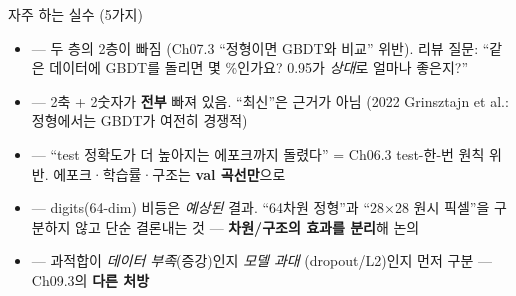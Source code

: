 \documentclass[aspectratio=169,11pt]{beamer}
\begin{document}
\begin{frame}{자주 하는 실수 (5가지)}
  \begin{itemize}
    \item {} —
      두 층의 2층이 빠짐 (Ch07.3 ``정형이면 GBDT와 비교'' 위반).
      리뷰 질문: ``같은 데이터에 GBDT를 돌리면 몇 \%인가요?
      0.95가 \textit{상대}로 얼마나 좋은지?''
    \item {} — 2축 + 2숫자가
      \textbf{전부} 빠져 있음. ``최신''은 근거가 아님 (2022
      Grinsztajn et al.: 정형에서는 GBDT가 여전히 경쟁적)
    \item {} — ``test 정확도가 더 높아지는
      에포크까지 돌렸다'' = Ch06.3 test-한-번 원칙 위반.
      에포크·학습률·구조는 \textbf{val 곡선만}으로
    \item {} — digits(64-dim) 비등은 \textit{예상된} 결과.
      ``64차원 정형''과 ``28$\times$28 원시 픽셀''을 구분하지 않고
      단순 결론내는 것 — \textbf{차원/구조의 효과를 분리}해 논의
    \item {} —
      과적합이 \textit{데이터 부족}(증강)인지 \textit{모델 과대}
      (dropout/L2)인지 먼저 구분 — Ch09.3의 \textbf{다른 처방}
  \end{itemize}
\end{frame}
\end{document}
